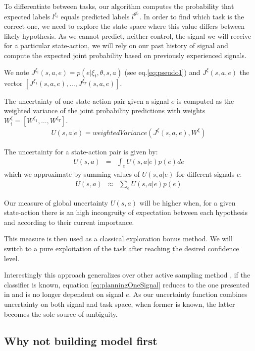 To differentiate between tasks, our algorithm computes the probability that expected labels $l^{\xi_t}$ equals predicted labels $l^{\theta^{\xi_t}}$. In order to find which task is the correct one, we need to explore the state space where this value differs between likely hypothesis. As we cannot predict, neither control, the signal we will receive for a particular state-action, we will rely on our past history of signal and compute the expected joint probability based on previously experienced signals.

We note $J^{\xi_t}(s,a,e) = p(e | \xi_t, \theta, s, a)$ (see eq.\ref{eq:pseudo1}) and $J^{\xi}(s,a,e)$ the vector $[J^{\xi_1}(s,a,e), \ldots, J^{\xi_T}(s,a,e)]$.

The uncertainty of one state-action pair given a signal $e$ is computed as the weighted variance of the joint probability predictions with weights $W_{i}^{\xi} = [W^{\xi_1}, \ldots, W^{\xi_T}]$.
\begin{eqnarray}
U(s,a|e) = weightedVariance(J^{\xi}(s,a,e), W^{\xi})
\label{eq:planningOneSignal}
\end{eqnarray}

The uncertainty for a state-action pair is given by:
\begin{eqnarray}
U(s,a) & = & \int_{e} U(s,a|e) p(e) de
\end{eqnarray}
which we approximate by summing values of $U(s,a|e)$ for different signals $e$:
\begin{eqnarray}
U(s,a) & \approx & \sum_{e} U(s,a|e) p(e)
\label{eq:planning}
\end{eqnarray}

Our measure of global uncertainty $U(s,a)$ will be higher when, for a given state-action there is an high incongruity of expectation between each hypothesis and according to their current importance. 

This measure is then used as a classical exploration bonus method. We will switch to a pure exploitation of the task after reaching the desired confidence level.

Interestingly this approach generalizes over other active sampling method \cite{lopes2009active}, if the classifier is known, equation \ref{eq:planningOneSignal} reduces to the one presented in \cite{macl11simul} and is no longer dependent on signal $e$. As our uncertainty function combines uncertainty on both signal and task space, when former is known, the latter becomes the sole source of ambiguity.

\subsection{Why not building model first}


